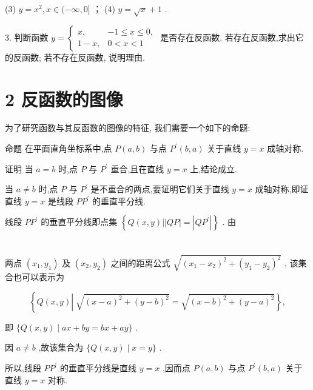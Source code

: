 \documentclass[10pt]{article}
\begin{document}
(3) \(y = {x}^{2},x \in  ( - \infty ,0\rbrack\) ； (4) \(y = \sqrt{x} + 1\) .

3. 判断函数 \(y = \left\{  \begin{matrix} x, &  - 1 \leq  x \leq  0, \\  1 - x, & 0 < x < 1 \end{matrix}\right.\) 是否存在反函数. 若存在反函数,求出它的反函数; 若不存在反函数, 说明理由.

\section*{2 反函数的图像}

为了研究函数与其反函数的图像的特征, 我们需要一个如下的命题:

命题 在平面直角坐标系中,点 \(P\left( {a,b}\right)\) 与点 \({P}^{\prime }\left( {b,a}\right)\) 关于直线 \(y = x\) 成轴对称.

证明 当 \(a = b\) 时,点 \(P\) 与 \({P}^{\prime }\) 重合,且在直线 \(y = x\) 上,结论成立.

当 \(a \neq  b\) 时,点 \(P\) 与 \({P}^{\prime }\) 是不重合的两点,要证明它们关于直线 \(y = x\) 成轴对称,即证直线 \(y = x\) 是线段 \(P{P}^{\prime }\) 的垂直平分线.

线段 \(P{P}^{\prime }\) 的垂直平分线即点集 \(\left\{  {Q\left( {x,y}\right) \left| \right| {QP} \mid   = \left| {Q{P}^{\prime }}\right| }\right\}\) . 由

\section*{}

两点 \(\left( {{x}_{1},{y}_{1}}\right)\) 及 \(\left( {{x}_{2},{y}_{2}}\right)\) 之间的距离公式 \(\sqrt{{\left( {x}_{1} - {x}_{2}\right) }^{2} + {\left( {y}_{1} - {y}_{2}\right) }^{2}}\) , 该集合也可以表示为

\[
\left\{  {Q\left( {x,y}\right) \left| {\;\sqrt{{\left( x - a\right) }^{2} + {\left( y - b\right) }^{2}} = \sqrt{{\left( x - b\right) }^{2} + {\left( y - a\right) }^{2}}}\right. }\right\}  ,
\]

即 \(\{ Q\left( {x,y}\right)  \mid  {ax} + {by} = {bx} + {ay}\}\) .

因 \(a \neq  b\) ,故该集合为 \(\{ Q\left( {x,y}\right)  \mid  x = y\}\) .

所以,线段 \(P{P}^{\prime }\) 的垂直平分线是直线 \(y = x\) ,因而点 \(P\left( {a,b}\right)\) 与点 \({P}^{\prime }\left( {b,a}\right)\) 关于直线 \(y = x\) 对称.
\end{document}
